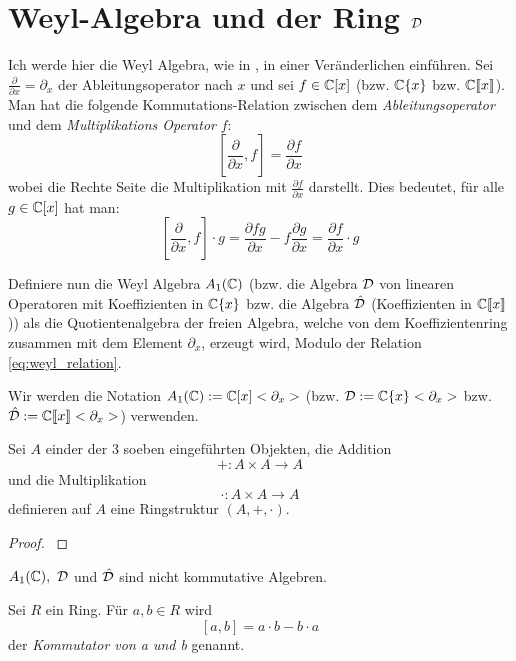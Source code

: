 \section{Weyl-Algebra und der Ring $\mathcal{D}$} %
Ich werde hier die Weyl Algebra, wie in
\cite[Chapter~1]{sabbah_cimpa90}, in einer Veränderlichen einführen.
Sei $\frac{\partial}{\partial x}=\partial_x$ der Ableitungsoperator nach $x$
und sei $f \in\mathbb{C}[x]$ (bzw. $\mathbb{C}\{x\}$ bzw. $\mathbb{C}\llbracket x\rrbracket$).
Man hat die folgende Kommutations-Relation zwischen dem
\emph{Ableitungsoperator}
und dem \emph{Multiplikations Operator} $f$:
\begin{equation}\label{eq:weyl_relation}
  [\frac{\partial}{\partial x},f]=\frac{\partial f}{\partial x}
\end{equation}
wobei die Rechte Seite die Multiplikation mit $\frac{\partial f}{\partial x}$
darstellt. Dies bedeutet, für alle $g\in\mathbb{C}[x]$ hat man:
\[
  [\frac{\partial}{\partial x},f]\cdot g
  =\frac{\partial fg}{\partial x} - f\frac{\partial g}{\partial x}
  =\frac{\partial f}{\partial x} \cdot g
\]
\begin{defn}
  Definiere nun die Weyl Algebra $A_1(\mathbb{C})$ (bzw. die Algebra $\mathcal{D}$ von
  linearen Operatoren mit Koeffizienten in $\mathbb{C}\{x\}$ bzw. die Algebra
  $\hat{\mathcal{D}}$ (Koeffizienten in $\mathbb{C}\llbracket x\rrbracket$)) als die
  Quotientenalgebra der freien Algebra, welche von dem Koeffizientenring
  zusammen mit dem Element $\partial_x$, erzeugt wird, Modulo der Relation
  \eqref{eq:weyl_relation}.
\end{defn}
Wir werden die Notation $A_1(\mathbb{C}):=\mathbb{C}[x]<\partial_x>$ (bzw.
$\mathcal{D}:=\mathbb{C}\{x\}<\partial_x>$ bzw. 
$\hat{\mathcal{D}}:=\mathbb{C}\llbracket x\rrbracket<\partial_x>$) verwenden.

\begin{lem} %
  Sei $A$ einder der 3 soeben eingeführten Objekten, die Addition 
  \[
    +:A\times A \rightarrow A
  \]
  und die Multiplikation
  \[
    \cdot:A\times A \rightarrow A
  \]
  definieren auf $A$ eine Ringstruktur $(A,+,\cdot)$.
\end{lem}
\begin{proof}
  \cite[Kapittel 2 Section 1]{ZulaBarbara}
\end{proof}

\begin{rem}
  $A_1(\mathbb{C}),~\mathcal{D}$ und $\hat{\mathcal{D}}$ sind nicht kommutative Algebren.
\end{rem}

\begin{defn}[Kommutator]%
  Sei $R$ ein Ring. Für $a,b\in R$ wird
  \[[a,b]=a\cdot b-b\cdot a\]
  der \emph{Kommutator von a und b} genannt.
\end{defn}


